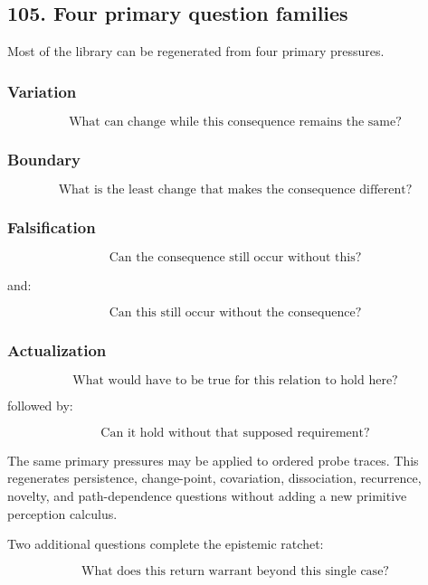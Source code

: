 \documentclass[
]{article}
\begin{document}
\subsection{105. Four primary question
families}\label{four-primary-question-families}

Most of the library can be regenerated from four primary pressures.

\subsubsection{Variation}\label{variation}

\[
\boxed{
\text{What can change while this consequence remains the same?}
}
\]

\subsubsection{Boundary}\label{boundary}

\[
\boxed{
\text{What is the least change that makes the consequence different?}
}
\]

\subsubsection{Falsification}\label{falsification}

\[
\boxed{
\text{Can the consequence still occur without this?}
}
\]

and:

\[
\boxed{
\text{Can this still occur without the consequence?}
}
\]

\subsubsection{Actualization}\label{actualization}

\[
\boxed{
\text{What would have to be true for this relation to hold here?}
}
\]

followed by:

\[
\boxed{
\text{Can it hold without that supposed requirement?}
}
\]

The same primary pressures may be applied to ordered probe traces. This
regenerates persistence, change-point, covariation, dissociation, recurrence,
novelty, and path-dependence questions without adding a new primitive
perception calculus.

Two additional questions complete the epistemic ratchet:

\[
\boxed{
\text{What does this return warrant beyond this single case?}
}
\]
\end{document}
